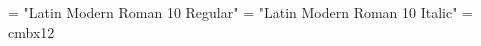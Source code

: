 
\font\tenrm = "Latin Modern Roman 10 Regular"
\font\tenit = "Latin Modern Roman 10 Italic"
\font\twelvebf = cmbx12